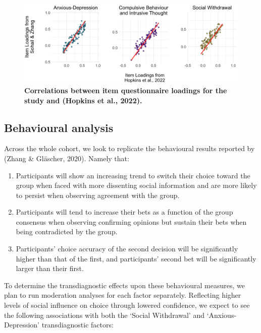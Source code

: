\documentclass[12pt,a4paper,oneside,]{book} %
\begin{document}
\begin{figure}
\includegraphics[width=1\linewidth]{figures/factor_correlations} \caption{{\textbf{Correlations between item questionnaire loadings for the study and (Hopkins et al., 2022).}}}\label{fig:figure-3-factor-correlations}
\end{figure}



\subsection{Behavioural analysis}\label{behavioural-analysis}

Across the whole cohort, we look to replicate the behavioural results reported by (Zhang \& Gläscher, 2020). Namely that:

\begin{enumerate}
\def\labelenumi{\arabic{enumi}.}
\item
  Participants will show an increasing trend to switch their choice toward the group when faced with more dissenting social information and are more likely to persist when observing agreement with the group.
\item
  Participants will tend to increase their bets as a function of the group consensus when observing confirming opinions but sustain their bets when being contradicted by the group.
\item
  Participants' choice accuracy of the second decision will be significantly higher than that of the first, and participants' second bet will be significantly larger than their first.
\end{enumerate}

To determine the transdiagnostic effects upon these behavioural measures, we plan to run moderation analyses for each factor separately. Reflecting higher levels of social influence on choice through lowered confidence, we expect to see the following associations with both the `Social Withdrawal' and `Anxious-Depression' transdiagnostic factors:
\end{document}
